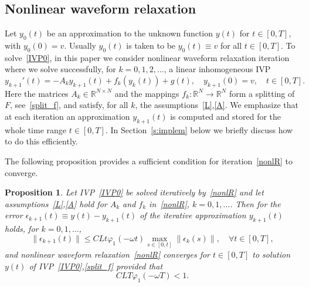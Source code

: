 \documentclass[sn-aps]{sn-jnl}
\theoremstyle{thmstyleone}%
\newtheorem{proposition}[theorem]{Proposition}%
\theoremstyle{thmstyletwo}%
\theoremstyle{thmstylethree}%
\newcommand{\leqs}{\leqslant}
\newcommand{\Rr}{\mathbb{R}}
\begin{document}
\subsection{Nonlinear waveform relaxation}
\label{s:conv}
Let $y_0(t)$ be an approximation to the unknown function $y(t)$
for $t\in[0,T]$, with $y_0(0)=v$.
Usually $y_0(t)$ is taken to be $y_0(t)\equiv v$ for all $t\in[0,T]$.
To solve~\eqref{IVP0}, in this paper we consider nonlinear waveform relaxation iteration
where we solve successfully, 
for $k=0,1,2,\dots$, a linear inhomogeneous IVP
\begin{equation}
\label{nonlR}
y_{k+1}'(t) = -A_k y_{k+1}(t) + f_k(y_k(t)) + g(t),  
\quad y_{k+1}(0)=v,\quad t\in[0,T].
\end{equation}
Here the matrices $A_k\in\Rr^{N\times N}$ and the mappings $f_k:\Rr^N\rightarrow\Rr^N$ 
form a splitting of $F$, see~\eqref{split_f}, and satisfy, for all $k$,
the assumptions~\eqref{L},\eqref{A}.
We emphasize that at each iteration an approximation $y_{k+1}(t)$ is computed
and stored for the whole time range $t\in[0,T]$.  In Section~\ref{s:implem}
below we briefly discuss how to do this
efficiently. 

The following proposition provides a sufficient condition for 
iteration~\eqref{nonlR} to converge.  

\begin{proposition}
\label{prop1}
Let IVP~\eqref{IVP0} be solved iteratively by~\eqref{nonlR} and let 
assumptions~\eqref{L},\eqref{A} hold for $A_k$ and $f_k$ in~\eqref{nonlR}, $k=0,1,\dots$.
Then for the error $\epsilon_{k+1}(t)\equiv y(t) - y_{k+1}(t)$
of the iterative approximation $y_{k+1}(t)$ holds, for $k=0,1,\dots$,
\begin{equation}
\label{est1}
\|\epsilon_{k+1}(t)\|\leqs C L t\varphi_1(-\omega t)
\max_{s\in[0,t]} \|\epsilon_k(s)\|, \quad \forall t\in[0,T],
\end{equation}
and nonlinear waveform relaxation~\eqref{nonlR} converges for $t\in[0,T]$
to solution $y(t)$ of IVP~\eqref{IVP0},\eqref{split_f} provided that
\begin{equation}
\label{conv}
C L T\varphi_1(-\omega T) <1.  
\end{equation}
\end{proposition}
\end{document}
